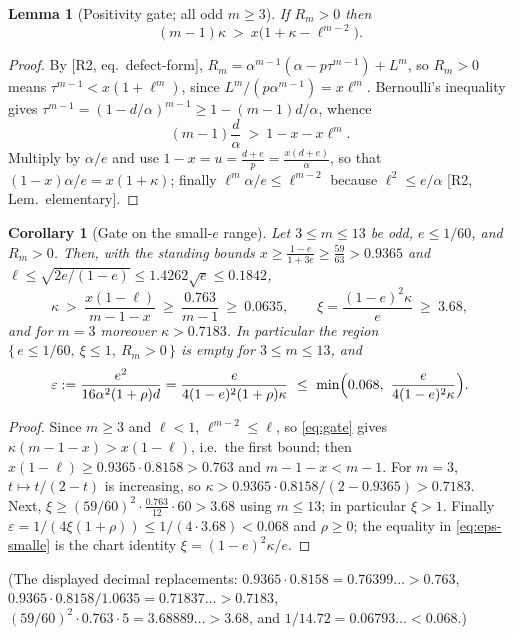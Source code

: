 \documentclass[11pt]{amsart}
\newcommand{\eps}{\varepsilon}
\newtheorem{lemma}[theorem]{Lemma}
\newtheorem{corollary}[theorem]{Corollary}
\begin{document}
\begin{lemma}[Positivity gate; all odd $m\ge3$]\label{lem:gate}
If $R_m>0$ then
\begin{equation}\label{eq:gate}
 (m-1)\kappa\ >\ x\bigl(1+\kappa-\ell^{m-2}\bigr).
\end{equation}
\end{lemma}

\begin{proof}
By [R2, eq.~defect-form], $R_m=\alpha^{m-1}(\alpha-p\tau^{m-1})+L^m$, so
$R_m>0$ means $\tau^{m-1}<x(1+\ell^m)$, since
$L^m/(p\alpha^{m-1})=x\ell^m$.  Bernoulli's inequality gives
$\tau^{m-1}=(1-d/\alpha)^{m-1}\ge1-(m-1)d/\alpha$, whence
\[
 (m-1)\frac d\alpha\ >\ 1-x-x\ell^m .
\]
Multiply by $\alpha/e$ and use $1-x=u=\frac{d+e}p=\frac{x(d+e)}\alpha$, so
that $(1-x)\alpha/e=x(1+\kappa)$; finally
$\ell^m\alpha/e\le\ell^{m-2}$ because $\ell^2\le e/\alpha$
[R2, Lem.~elementary].
\end{proof}

\begin{corollary}[Gate on the small-$e$ range]\label{cor:gate-smalle}
Let $3\le m\le13$ be odd, $e\le1/60$, and $R_m>0$.  Then, with the standing
bounds $x\ge\frac{1-e}{1+3e}\ge\frac{59}{63}>0.9365$ and
$\ell\le\sqrt{2e/(1-e)}\le1.4262\sqrt e\le0.1842$,
\begin{equation}\label{eq:gate-smalle}
 \kappa\ >\ \frac{x(1-\ell)}{m-1-x}\ \ge\ \frac{0.763}{m-1}\ \ge\ 0.0635,
 \qquad
 \xi=\frac{(1-e)^2\kappa}e\ \ge\ 3.68,
\end{equation}
and for $m=3$ moreover $\kappa>0.7183$.  In particular the region
$\{\,e\le1/60,\ \xi\le1,\ R_m>0\,\}$ is empty for $3\le m\le13$, and
\begin{equation}\label{eq:eps-smalle}
 \eps:=\frac{e^2}{16\alpha^2(1+\rho)d}=\frac{e}{4(1-e)^2(1+\rho)\kappa}
 \ \le\ \min\Bigl(0.068,\ \frac{e}{4(1-e)^2\kappa}\Bigr).
\end{equation}
\end{corollary}

\begin{proof}
Since $m\ge3$ and $\ell<1$, $\ell^{m-2}\le\ell$, so \eqref{eq:gate} gives
$\kappa(m-1-x)>x(1-\ell)$, i.e.\ the first bound; then
$x(1-\ell)\ge0.9365\cdot0.8158>0.763$ and $m-1-x<m-1$.  For $m=3$,
$t\mapsto t/(2-t)$ is increasing, so
$\kappa>0.9365\cdot0.8158/(2-0.9365)>0.7183$.  Next,
$\xi\ge(59/60)^2\cdot\frac{0.763}{12}\cdot60>3.68$ using $m\le13$; in
particular $\xi>1$.  Finally $\eps=1/(4\xi(1+\rho))\le1/(4\cdot3.68)<0.068$
and $\rho\ge0$; the equality in \eqref{eq:eps-smalle} is the chart identity
$\xi=(1-e)^2\kappa/e$.
\end{proof}
(The displayed decimal replacements: $0.9365\cdot0.8158=0.76399\ldots>0.763$,
$0.9365\cdot0.8158/1.0635=0.71837\ldots>0.7183$,
$(59/60)^2\cdot0.763\cdot5=3.68889\ldots>3.68$, and
$1/14.72=0.06793\ldots<0.068$.)
\end{document}
